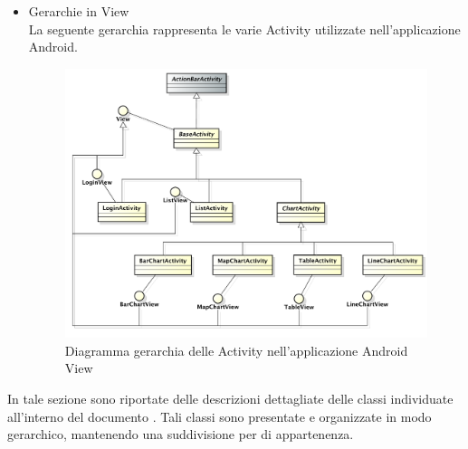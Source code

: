 \begin{itemize}
\begin{figure}[H]
                    \end{figure}
                \item Gerarchie in View \\
                    La seguente gerarchia rappresenta le varie Activity utilizzate nell'applicazione Android.
                    \begin{figure}[H]
                        \centering
                        \includegraphics[width=1\textwidth]{DefinizioneDiProdotto/Pics/Gerarchie/ApplicazioneActivity.pdf}
                        \caption{Diagramma gerarchia delle Activity nell'applicazione Android View}
                    \end{figure}
		
            \end{itemize}
        In tale sezione sono riportate delle descrizioni dettagliate delle classi individuate all'interno del documento . Tali classi sono presentate e organizzate in modo gerarchico, mantenendo una suddivisione per  di appartenenza.
        
        

